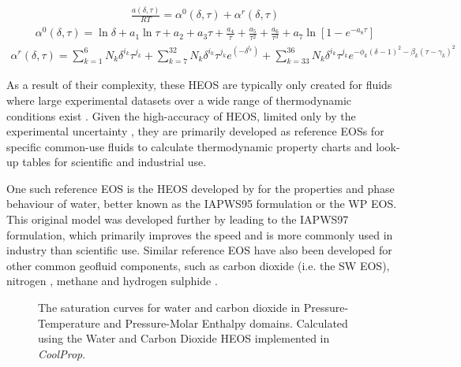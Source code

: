         \begin{align}
            \frac{a (\delta, \tau)}{R T} = \alpha^0 (\delta, \tau) + \alpha^r (\delta, \tau) \label{eq:helmholtz_EOS}
        \end{align}
        \begin{align}
            \alpha^0 (\delta, \tau) = \ln \delta + a_1 \ln \tau + a_2 + a_3 \tau + \frac{a_4}{\tau} + \frac{a_5}{\tau^2} + \frac{a_6}{\tau^3} + a_7 \ln[1-e^{-a_8\tau}]  \label{eq:HEOS_ig_term}
        \end{align}
        \begin{align}
            \alpha^r (\delta, \tau) = \sum_{k=1}^{6} N_k \delta^{i_k} \tau^{j_k} + \sum_{k=7}^{32} N_k \delta^{i_k} \tau^{j_k} e^{(-\delta^{l_k})} + \sum_{k=33}^{36} N_k \delta^{i_k} \tau^{j_k} e^{-\phi_k(\delta-1)^2-\beta_k(\tau-\gamma_k)^2} \label{eq:HEOS_residual}
        \end{align}

        As a result of their complexity, these \ac{HEOS} are typically only created for fluids where large experimental datasets over a wide range of thermodynamic conditions exist \cite{Lemmon1999}. Given the high-accuracy of \ac{HEOS}, limited only by the experimental uncertainty \cite{Lemmon1999},  they are primarily developed as reference \ac{EOS}s for specific common-use fluids to calculate thermodynamic property charts and look-up tables for scientific and industrial use.

        One such reference \ac{EOS} is the \ac{HEOS} developed by \citeauthor{Wagner2002} for the properties and phase behaviour of water, better known as the IAPWS95 \cite{IAPWS2018} formulation or the \ac{WP} \ac{EOS}. This original model was developed further by \citeauthor{Wagner2000} leading to the IAPWS97 \cite{IAPWS2018} formulation, which primarily improves the speed and is more commonly used in industry than scientific use. Similar reference \ac{EOS} have also been developed for other common geofluid components, such as carbon dioxide \cite{Span1996} (i.e. the \ac{SW} \ac{EOS}), nitrogen \cite{Span2000}, methane \cite{Setzmann1991} and hydrogen sulphide \cite{Lemmon2006}.

        \begin{figure}[H]
            \centering
            
            \caption[Saturation curves of water and carbon dioxide]{The saturation curves for water and carbon dioxide in Pressure-Temperature and Pressure-Molar Enthalpy domains. Calculated using the Water and Carbon Dioxide \ac{HEOS} implemented in \emph{CoolProp}.}
            \label{fig:SaturationCurves}
        \end{figure}


